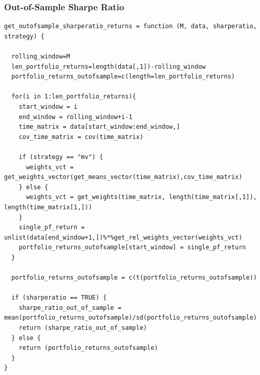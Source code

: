 \documentclass{article}
\begin{document}
\subsubsection{Out-of-Sample Sharpe Ratio}
\begin{lstlisting}[caption={This example shows how the out-of-sample sharpe ratio and the out-of-sample portfolio returns are computed in R.}, label=code:1, frame=single]
get_outofsample_sharperatio_returns = function (M, data, sharperatio, strategy) {

  rolling_window=M
  len_portfolio_returns=length(data[,1])-rolling_window
  portfolio_returns_outofsample=c(length=len_portfolio_returns)
 
  for(i in 1:len_portfolio_returns){
    start_window = i
    end_window = rolling_window+i-1
    time_matrix = data[start_window:end_window,]
    cov_time_matrix = cov(time_matrix)
    
    if (strategy == "mv") { 
      weights_vct = get_weights_vector(get_means_vector(time_matrix),cov_time_matrix)
    } else { 
      weights_vct = get_weights(time_matrix, length(time_matrix[,1]), length(time_matrix[1,]))
    }
    single_pf_return = unlist(data[end_window+1,])%*%get_rel_weights_vector(weights_vct)
    portfolio_returns_outofsample[start_window] = single_pf_return
  }
  
  portfolio_returns_outofsample = c(t(portfolio_returns_outofsample))
  
  if (sharperatio == TRUE) { 
    sharpe_ratio_out_of_sample = mean(portfolio_returns_outofsample)/sd(portfolio_returns_outofsample)
    return (sharpe_ratio_out_of_sample) 
  } else { 
    return (portfolio_returns_outofsample)
  }
}
\end{lstlisting}
\end{document}
